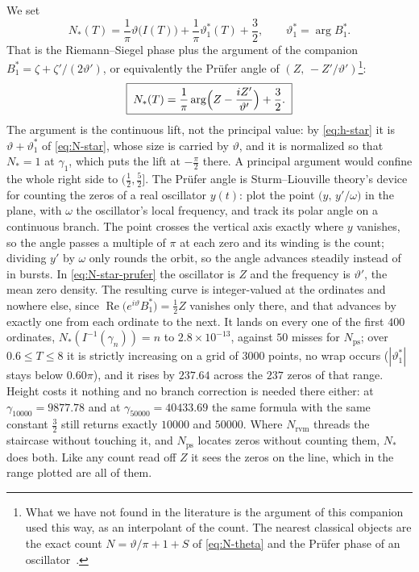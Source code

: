 \documentclass[11pt]{article}
\theoremstyle{definition}
\begin{document}
We set
\begin{equation}\label{eq:N-star}
N_{\ast}(T)=\frac{1}{\pi}\vartheta\bigl(I(T)\bigr)
+\frac{1}{\pi}\vartheta_1^{\ast}(T)+\frac32,
\qquad \vartheta_1^{\ast}=\arg B_1^{\ast}.
\end{equation}
That is the Riemann--Siegel phase plus the argument of the companion
$B_1^{\ast}=\zeta+\zeta'/(2\vartheta')$, or equivalently the Pr\"ufer angle
of $(Z,\,-Z'/\vartheta')$\footnote{What we have not found in the literature
is the argument of this companion used this way, as an interpolant of the
count. The nearest classical
objects are the exact count $N=\vartheta/\pi+1+S$ of \eqref{eq:N-theta} and the
Pr\"ufer phase of an oscillator~\cite{Prufer1926}.}:
\begin{equation}\label{eq:N-star-prufer}
\boxed{\;
N_{\ast}(T)
=\frac{1}{\pi}\arg\Bigl(Z-\frac{iZ'}{\vartheta'}\Bigr)+\frac32.
\;}
\end{equation}
The argument is the continuous lift, not the principal value: by
\eqref{eq:h-star} it is $\vartheta+\vartheta_1^{\ast}$ of \eqref{eq:N-star},
whose size is carried by $\vartheta$, and it is normalized so that
$N_{\ast}=1$ at $\gamma_1$, which puts the lift at $-\tfrac\pi2$ there.
A principal argument would confine the whole right side to
$(\tfrac12,\tfrac52]$.
The Pr\"ufer angle is Sturm--Liouville theory's device for counting the zeros
of a real oscillator $y(t)$: plot the point $\bigl(y,\,y'/\omega\bigr)$ in the
plane, with $\omega$ the oscillator's local frequency, and track its polar
angle on a continuous branch. The point crosses the vertical axis exactly
where $y$ vanishes, so the angle passes a multiple of $\pi$ at each zero and
its winding is the count; dividing $y'$ by $\omega$ only rounds the orbit,
so the angle advances steadily instead of in bursts. In
\eqref{eq:N-star-prufer} the oscillator is $Z$ and the frequency is
$\vartheta'$, the mean zero density.
The resulting curve is integer-valued at the ordinates and nowhere else, since
$\operatorname{Re}\bigl(e^{i\vartheta}B_1^{\ast}\bigr)=\tfrac12Z$ vanishes only
there, and that advances by exactly one from each ordinate to the next. It lands
on every one of the first $400$ ordinates, $N_{\ast}(I^{-1}(\gamma_n))=n$ to
$2.8\times10^{-13}$, against $50$ misses for $N_{\mathrm{ps}}$; over
$0.6\leq T\leq8$ it is strictly increasing on a grid of $3000$ points, no wrap
occurs ($|\vartheta_1^{\ast}|$ stays below $0.60\pi$), and it rises by $237.64$
across the $237$ zeros of that range. Height costs it nothing and no branch
correction is needed there either: at $\gamma_{10000}=9877.78$ and at
$\gamma_{50000}=40433.69$ the same formula with the same constant $\tfrac32$
still returns exactly $10000$ and $50000$. Where $N_{\mathrm{rvm}}$ threads the
staircase without touching it, and $N_{\mathrm{ps}}$ locates zeros without
counting them, $N_{\ast}$ does both. Like any count read off $Z$ it sees the
zeros on the line, which in the range plotted are all of them.
\end{document}
